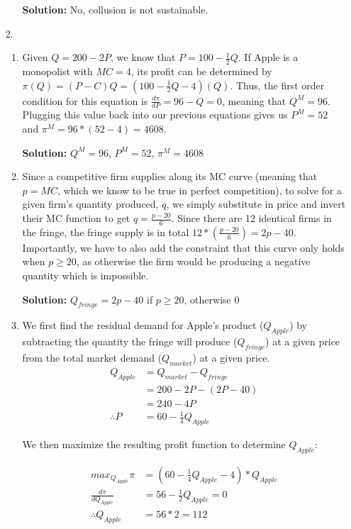 \documentclass[12pt,letterpaper]{article}
\begin{document}
\begin{enumerate}
\begin{enumerate}
	{\color{blue} \textbf{Solution:} No, collusion is not sustainable.}
\end{enumerate} 

\item[2.]

\begin{enumerate}
	\item Given $Q = 200 - 2P$, we know that $P = 100 - \frac{1}{2}Q$. If Apple is a monopolist with $MC = 4$, its profit can be determined by $\pi(Q) = (P-C)Q =  (100 - \frac{1}{2}Q - 4) (Q)$. Thus, the first order condition for this equation is $\frac{d \pi}{d P} = 96 - Q = 0$, meaning that $Q^M = 96$. Plugging this value back into our previous equations gives us $P^M = 52$ and $\pi^M = 96 * (52- 4) = 4608$.
	
	{\color{blue}\textbf{Solution:} $Q^M = 96$, $P^M = 52$, $\pi^M = 4608$}

	\item Since a competitive firm supplies along its MC curve (meaning that $p = MC$, which we know to be true in perfect competition), to solve for a given firm's quantity produced, $q$, we simply substitute in price and invert their MC function to get $q = \frac{p-20}{6}$. Since there are 12 identical firms in the fringe, the fringe supply is in total $12 * (\frac{p-20}{6}) = 2p - 40$. Importantly, we have to also add the constraint that this curve only holds when $p \geq 20$, as otherwise the firm would be producing a negative quantity which is impossible.
	
	{\color{blue}\textbf{Solution:} $Q_{fringe} = 2p - 40$ if $p \geq 20$, otherwise 0}

	\item We first find the residual demand for Apple's product ($Q_{Apple}$) by subtracting the quantity the fringe will produce ($Q_{fringe}$) at a given price from the total market demand ($Q_{market}$) at a given price.
	\begin{align*}
		Q_{Apple} &= Q_{market} - Q_{fringe} \\
		&= 200 - 2P - (2P - 40) \\
		&= 240 - 4P \\
		\therefore P &= 60 - \frac{1}{4}Q_{Apple}
	\end{align*}

	We then maximize the resulting profit function to determine $Q_{Apple}$:

	\begin{align*}
		max_{Q_{Apple}} \pi &= (60 - \frac{1}{4}Q_{Apple} - 4) * Q_{Apple} \\
		\frac{d\pi}{d Q_{Apple}} &= 56 - \frac{1}{2} Q_{Apple} = 0 \\
		\therefore Q_{Apple} &= 56 * 2 = 112
	\end{align*}


\end{enumerate}
\end{enumerate}
\end{document}

